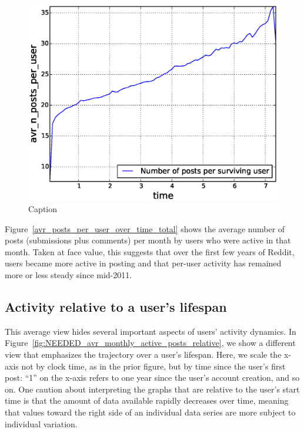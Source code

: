 \begin{figure}[!tb]
\centering
\includegraphics[scale=0.4]{./images/avr_posts_per_user_user_ref_total.eps}
\caption{Caption}
\label{fig:avr_posts_per_user_user_ref_total}
\end{figure}

Figure~\ref{avr_posts_per_user_over_time_total} shows the average number of posts (submissions plus comments) per month by users who were active in that month.  Taken at face value, this suggests that over the first few years of Reddit, users became more active in posting and that per-user activity has remained more or less steady since mid-2011.  

\subsection{Activity relative to a user's lifespan}


This average view hides several important aspects of users' activity dynamics.  In Figure~\ref{fig:NEEDED_avr_monthly_active_posts_relative}, we show a different view that emphasizes the trajectory over a user's lifespan.  Here, we scale the x-axis not by clock time, as in the prior figure, but by time since the user's first post: ``1'' on the x-axis refers to one year since the user's account creation, and so on.  
One caution about interpreting the graphs that are relative to the user's start time is that the amount of data available rapidly decreases over time, meaning that values toward the right side of an individual data series are more subject to individual variation.  

